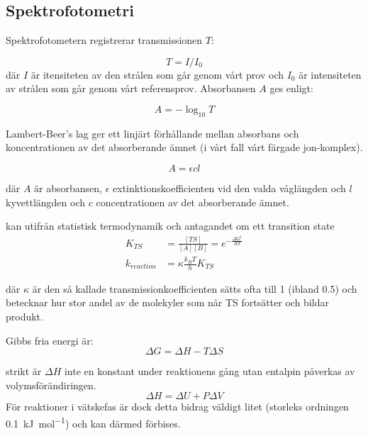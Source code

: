 \subsection{Spektrofotometri}
Spektrofotometern registrerar transmissionen $T$:

\begin{equation}
  T = I/I_0
\end{equation}
där $I$ är itensiteten av den strålen som går genom vårt prov
och $I_0$ är intensiteten av strålen som går genom vårt referensprov.
Absorbansen $A$ ges enligt:

\begin{equation}
  \label{eq:absorbance}
  A = -\log_{10}T
\end{equation}

Lambert-Beer's lag ger ett linjärt förhållande mellan absorbans och
koncentrationen av det absorberande ämnet (i vårt fall vårt färgade jon-komplex). 

\begin{equation}
  \label{eq:lambert-beer}
  A = \epsilon c l
\end{equation}

där $A$ är absorbansen, $\epsilon$ extinktionskoefficienten vid den valda
våglängden och $l$ kyvettlängden och $c$ concentrationen av det
absorberande ämnet. 




kan utifrån
statistisk termodynamik och antagandet om ett transition state
\begin{align}
  \label{eq:K_TS}
  K_{TS} &=\frac{[TS]}{[A][B]}=e^{-\frac{\Delta G^{\ddag}}{RT}} \\
  \label{eq:k_tst}
  k_{reaction} &=\kappa\frac{k_{B}T}{h}K_{TS}
\end{align}

där $\kappa$ är den så kallade transmissionkoefficienten sätts ofta till
1 (ibland 0.5) och betecknar hur stor andel av de molekyler som når TS
fortsätter och bildar produkt.

Gibbs fria energi är:
\begin{equation}
  \label{eq:gibbs}
  \Delta G = \Delta H - T\Delta S
\end{equation}

strikt är $\Delta H$ inte en konstant under reaktionens gång utan
entalpin påverkas av volymsförändiringen.
\begin{equation}
  \label{eq:enthalpy}
  \Delta H = \Delta U + P\Delta V
\end{equation}
För reaktioner i vätskefas är dock detta bidrag väldigt litet (storleks
ordningen \SI{0.1}{\kilo\joule\per\mole}) och kan därmed förbises.
